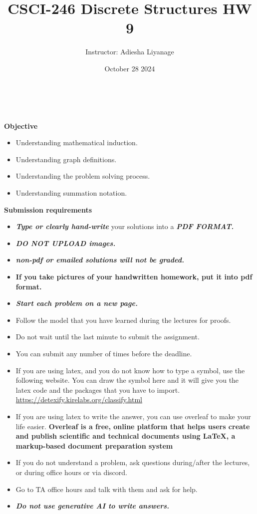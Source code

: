 \documentclass[12pt]{exam}
\title{CSCI-246 Discrete Structures HW 9}
\author{Instructor: Adiesha Liyanage}
\date{October 28 2024}
\begin{document}
\maketitle

\hrulefill
\\
\\
\textbf{Objective}
\begin{itemize}
    \item Understanding mathematical induction.
    \item Understanding graph definitions.
    \item Understanding the problem solving process.
    \item Understanding summation notation.
\end{itemize}

\textbf{Submission requirements}
\begin{itemize}
    \item \textbf{\textit{Type or clearly hand-write}} your solutions into a \textbf{\textit{PDF FORMAT.}} 
    \item \textbf{\textit{DO NOT UPLOAD images.}}
    \item \textbf{\textit{non-pdf or emailed solutions will not be graded.}}
    \item \textbf{If you take pictures of your handwritten homework, put it into pdf format.}
    \item \textbf{\textit{Start each problem on a new page.}}
    \item Follow the model that you have learned during the lectures for proofs.
    \item Do not wait until the last minute to submit the assignment.
    \item You can submit any number of times before the deadline. 
    \item If you are using latex, and you do not know how to type a symbol, use the following website. You can draw the symbol here and it will give you the latex code and the packages that you have to import. \url{https://detexify.kirelabs.org/classify.html}
    \item If you are using latex to write the answer, you can use overleaf to make your life easier. \textbf{Overleaf is a free, online platform that helps users create and publish scientific and technical documents using LaTeX, a markup-based document preparation system}
    \item If you do not understand a problem, ask questions during/after the lectures, or during office hours or via discord.
    \item Go to TA office hours and talk with them and ask for help.
    \item \textbf{\textit{Do not use generative AI to write answers.}} 
\end{itemize}
\end{document}
